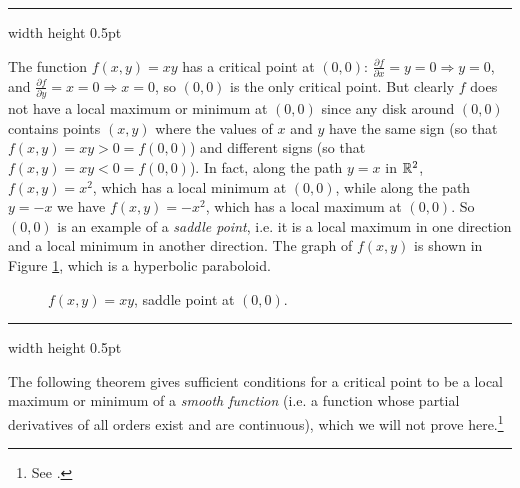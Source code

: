 \vspace{3mm}
\hrule width \textwidth height 0.5pt
\begin{exmp}
 The function $f(x,y) = xy$ has a critical point at $(0,0)$: $\frac{\partial f}{\partial x} = y = 0 \Rightarrow y=0$,
 and $\frac{\partial f}{\partial y} = x = 0 \Rightarrow x=0$, so $(0,0)$ is the only critical point. But clearly $f$
 does not have a local maximum or minimum at $(0,0)$ since any disk around $(0,0)$ contains points $(x,y)$ where the
 values of $x$ and $y$ have the same sign (so that $f(x,y) = xy > 0 = f(0,0)$) and different signs (so that $f(x,y) =
 xy < 0 = f(0,0)$). In fact, along the path $y=x$ in $\mathbb{R}^{2}$, $f(x,y) = x^2$, which has a
\newpage
\noindent local minimum at $(0,0)$,
 while along the path $y=-x$ we have $f(x,y)=-x^2$, which has a local maximum at $(0,0)$. So $(0,0)$ is an example of a
 \emph{saddle point}, i.e. it is a local maximum in one direction and a local minimum in another direction. The graph
 of $f(x,y)$ is shown in Figure \ref{fig:xy}, which is a hyperbolic paraboloid.
\end{exmp}\vspace{-16mm}
\begin{figure}[h]
 \begin{center}
  
 \end{center}\vspace{-18mm}
 \caption[]{\quad $f(x,y) = xy$, saddle point at $(0,0)$.}
 \label{fig:xy}
\end{figure}
\hrule width \textwidth height 0.5pt
\vspace{3mm}

The following theorem gives sufficient conditions for a critical point to be a local maximum or
minimum of a \emph{smooth function} (i.e. a function whose partial derivatives of all orders
exist and are continuous), which we will not prove here.\footnote{See \cite[\S\,7.6]{tm}.}


